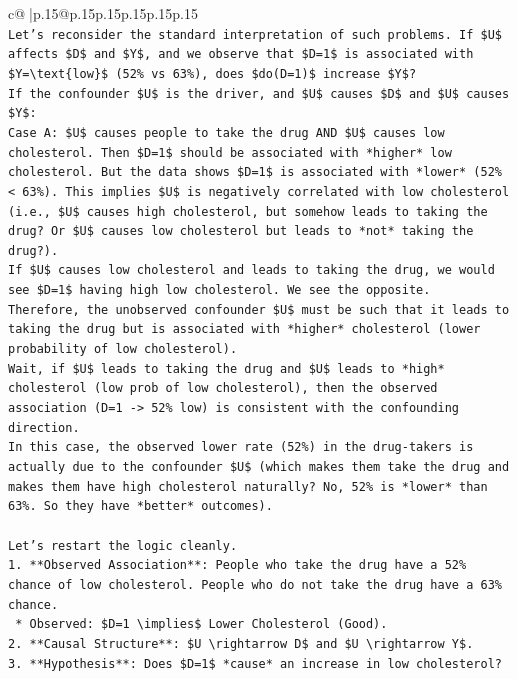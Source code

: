 \documentclass{article}
\begin{document}
{\begin{supertabular}{c@{$\;$}|p{.15\linewidth}@{}p{.15\linewidth}p{.15\linewidth}p{.15\linewidth}p{.15\linewidth}p{.15\linewidth}}
{{{\\ 
\texttt{Let's reconsider the standard interpretation of such problems. If \$U\$ affects \$D\$ and \$Y\$, and we observe that \$D=1\$ is associated with \$Y=\textbackslash{}text\{low\}\$ (52\% vs 63\%), does \$do(D=1)\$ increase \$Y\$?} \\
\texttt{If the confounder \$U\$ is the driver, and \$U\$ causes \$D\$ and \$U\$ causes \$Y\$:} \\
\texttt{Case A: \$U\$ causes people to take the drug AND \$U\$ causes low cholesterol. Then \$D=1\$ should be associated with *higher* low cholesterol. But the data shows \$D=1\$ is associated with *lower* (52\% < 63\%). This implies \$U\$ is negatively correlated with low cholesterol (i.e., \$U\$ causes high cholesterol, but somehow leads to taking the drug? Or \$U\$ causes low cholesterol but leads to *not* taking the drug?).} \\
\texttt{If \$U\$ causes low cholesterol and leads to taking the drug, we would see \$D=1\$ having high low cholesterol. We see the opposite.} \\
\texttt{Therefore, the unobserved confounder \$U\$ must be such that it leads to taking the drug but is associated with *higher* cholesterol (lower probability of low cholesterol).} \\
\texttt{Wait, if \$U\$ leads to taking the drug and \$U\$ leads to *high* cholesterol (low prob of low cholesterol), then the observed association (D=1 {-}> 52\% low) is consistent with the confounding direction.} \\
\texttt{In this case, the observed lower rate (52\%) in the drug{-}takers is actually due to the confounder \$U\$ (which makes them take the drug and makes them have high cholesterol naturally? No, 52\% is *lower* than 63\%. So they have *better* outcomes).} \\
\\ 
\texttt{Let's restart the logic cleanly.} \\
\texttt{1.  **Observed Association**: People who take the drug have a 52\% chance of low cholesterol. People who do not take the drug have a 63\% chance.} \\
\texttt{    *   Observed: \$D=1 \textbackslash{}implies\$ Lower Cholesterol (Good).} \\
\texttt{2.  **Causal Structure**: \$U \textbackslash{}rightarrow D\$ and \$U \textbackslash{}rightarrow Y\$.} \\
\texttt{3.  **Hypothesis**: Does \$D=1\$ *cause* an increase in low cholesterol?} \\
}}}
\end{supertabular}}
\end{document}
